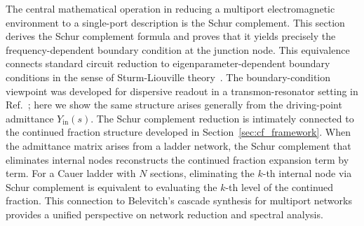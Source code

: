 \documentclass[reprint, floatfix, superscriptaddress, amsmath, amssymb, longbibliography]{revtex4-2}
\begin{document}
The central mathematical operation in reducing a multiport electromagnetic environment to a single-port description is the Schur complement. This section derives the Schur complement formula and proves that it yields precisely the frequency-dependent boundary condition at the junction node. This equivalence connects standard circuit reduction to eigenparameter-dependent boundary conditions in the sense of Sturm-Liouville theory~\cite{Zettl2005, Dijksma1987}. The boundary-condition viewpoint was developed for dispersive readout in a transmon-resonator setting in Ref.~\cite{BakrQM2025}; here we show the same structure arises generally from the driving-point admittance $Y_{\mathrm{in}}(s)$. The Schur complement reduction is intimately connected to the continued fraction structure developed in Section~\ref{sec:cf_framework}. When the admittance matrix arises from a ladder network, the Schur complement that eliminates internal nodes reconstructs the continued fraction expansion term by term. For a Cauer ladder with $N$ sections, eliminating the $k$-th internal node via Schur complement is equivalent to evaluating the $k$-th level of the continued fraction. This connection to Belevitch's cascade synthesis for multiport networks~\cite{Belevitch1960} provides a unified perspective on network reduction and spectral analysis.
\end{document}
